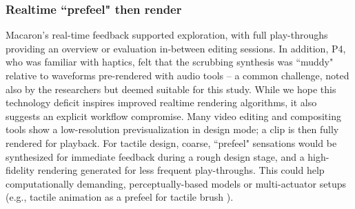     
%
%
    
    \subsubsection{Realtime ``prefeel" then render} %
    Macaron's real-time feedback supported exploration, with full play-throughs providing an overview or  evaluation in-between editing sessions.
    In addition, P4, who was familiar with haptics, felt that the scrubbing synthesis  was ``muddy" relative to waveforms pre-rendered with audio tools -- a common challenge, noted also by the researchers but deemed suitable for this study.
    While we hope this technology deficit inspires improved realtime rendering algorithms, it also suggests an explicit workflow compromise.
    Many video editing and compositing tools show a low-resolution previsualization in design mode; a clip is then fully rendered for playback.
    For tactile design, coarse, ``prefeel" sensations would be synthesized for immediate feedback during a rough design stage, and a high-fidelity rendering generated for less frequent play-throughs.
    This %
    could help computationally demanding, perceptually-based models or multi-actuator setups (e.g., tactile animation \cite{Schneider2015} as a prefeel for tactile brush \cite{Israr2011a}).

